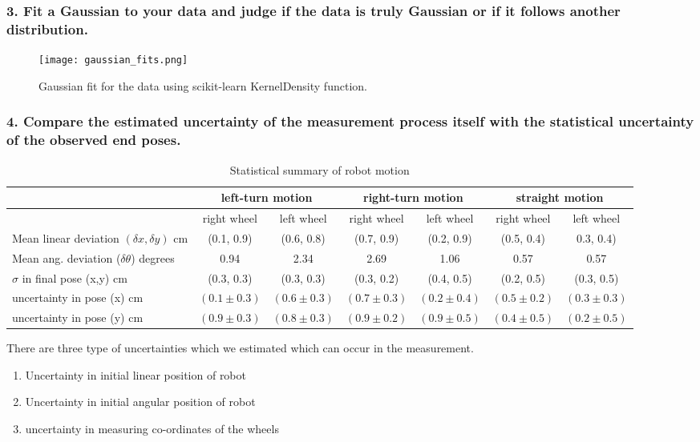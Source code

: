 \newpage
\subsubsection*{3. Fit a Gaussian to your data and judge if the data is truly Gaussian or if it follows another distribution.}

\begin{figure}[ht]
\centering
\texttt{[image: gaussian\_fits.png]}
\caption{Gaussian fit for the data using scikit-learn KernelDensity function. }
\label{gaussian}
\end{figure}

\newpage
\subsubsection*{4. Compare the estimated uncertainty of the measurement process itself with the statistical uncertainty of the observed end poses.}

\begin{table}[ht]
	\centering
	\begin{tabular}{| l | c | c | c | c | c | c |}
		\hline
		& \multicolumn{2}{c|}{left-turn motion} & \multicolumn{2}{c|}{ right-turn motion} & \multicolumn{2}{c|}{straight motion} \\
		\hline
		& right wheel & left wheel & right wheel & left wheel & right wheel & left wheel \\
		\hline
		Mean linear deviation $(\delta x, \delta y)$ cm & (0.1, 0.9) & (0.6, 0.8)
		& (0.7, 0.9) & (0.2, 0.9) & (0.5, 0.4) & 0.3, 0.4) \\
		\hline
		Mean ang. deviation ($\delta \theta$) degrees & 0.94 & 2.34 & 2.69 & 1.06 & 0.57 & 0.57 \\
		\hline
		$\sigma$ in final pose (x,y) cm & (0.3, 0.3) & (0.3, 0.3) & (0.3, 0.2) & (0.4, 0.5) & (0.2, 0.5) & (0.3, 0.5)\\
		\hline
		uncertainty in pose (x) cm & $(0.1 \pm 0.3)$ & $(0.6 \pm 0.3)$ & $(0.7 \pm 0.3)$ & $(0.2 \pm 0.4)$ & $(0.5 \pm 0.2)$ & $(0.3 \pm 0.3)$ \\
		uncertainty in pose (y) cm & $(0.9 \pm 0.3)$ & $(0.8 \pm 0.3)$ & $(0.9 \pm 0.2)$ & $(0.9 \pm 0.5)$ & $(0.4 \pm 0.5)$ & $(0.2 \pm 0.5)$ \\
		\hline
	\end{tabular}
	\caption{Statistical summary of robot motion}
	\label{stats}
\end{table}
There are three type of uncertainties which we estimated which can occur in the measurement. 
\begin{enumerate}
	\item Uncertainty in initial linear position of robot
	\item Uncertainty in initial angular position of robot
	\item uncertainty in measuring co-ordinates of the wheels
\end{enumerate}   

